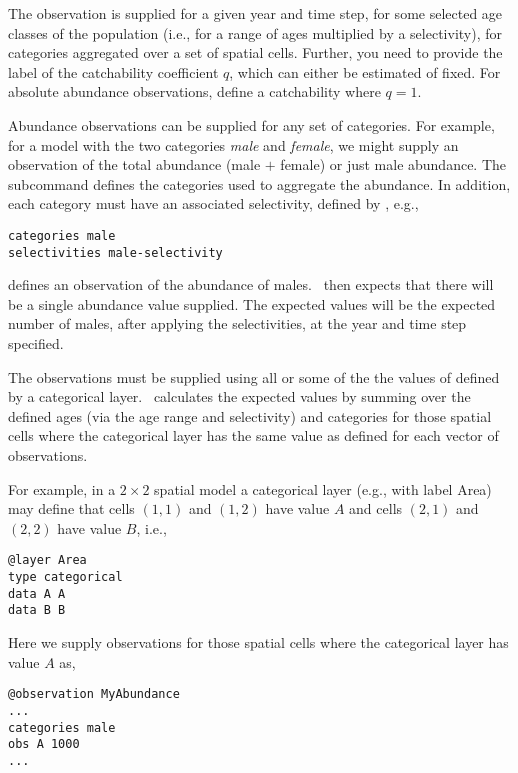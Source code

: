 The observation is supplied for a given year and time step, for some selected age classes of the population (i.e., for a range of ages multiplied by a selectivity), for categories aggregated over a set of spatial cells. Further, you need to provide the label of the catchability coefficient $q$, which can either be estimated of fixed. For absolute abundance observations, define a catchability where $q=1$.

Abundance observations can be supplied for any set of categories. For example, for a model with the two categories \emph{male} and \emph{female}, we might supply an observation of the total abundance (male $+$ female) or just male abundance. The subcommand  defines the categories used to aggregate the abundance. In addition, each category must have an associated selectivity, defined by , e.g., 

\begin{verbatim}
categories male
selectivities male-selectivity
\end{verbatim}

defines an observation of the abundance of males. \SPM\ then expects that there will be a single abundance value supplied. The expected values will be the expected number of males, after applying the selectivities, at the year and time step specified. 

The observations must be supplied using all or some of the the values of defined by a categorical layer. \SPM\ calculates the expected values by summing over the defined ages (via the age range and selectivity) and categories for those spatial cells where the categorical layer has the same value as defined for each vector of observations.

For example, in a $2 \times 2$ spatial model a categorical layer (e.g., with label Area) may define that cells $(1,1)$ and $(1,2)$ have value $A$ and cells $(2,1)$ and $(2,2)$ have value $B$, i.e.,

\begin{verbatim}
@layer Area
type categorical
data A A 
data B B
\end{verbatim}

Here we supply observations for those spatial cells where the categorical layer has value $A$ as, 

\begin{verbatim}
@observation MyAbundance
...
categories male 
obs A 1000
...
\end{verbatim}

